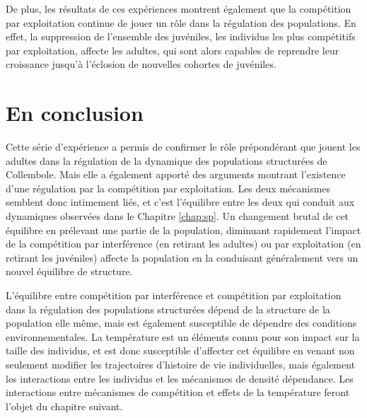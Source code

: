 De plus, les résultats de ces expériences montrent également que la compétition
par exploitation continue de jouer un rôle dans la régulation des populations.
En effet, la suppression de l'ensemble des juvéniles, les individus les plus
compétitifs par exploitation, affecte les adultes, qui sont alors capables de
reprendre leur croissance jusqu'à l'éclosion de nouvelles cohortes de juvéniles.

\section{En conclusion}

Cette série d'expérience a permis de confirmer le rôle
prépondérant que jouent les adultes dans la régulation de la dynamique des
populations structurées de Collembole. Mais elle a également apporté des
arguments montrant l'existence d'une régulation par la compétition par
exploitation. Les deux mécanismes semblent donc intimement liés, et c'est
l'équilibre entre les deux qui conduit aux dynamiques observées dans le Chapitre
\ref{chap:sp}. Un changement brutal de cet équilibre en prélevant une partie de
la population, diminuant rapidement l'impact de la compétition par interférence
(en retirant les adultes) ou par exploitation (en retirant les juvéniles)
affecte la population en la conduisant généralement vers un nouvel équilibre de
structure. 

L'équilibre entre compétition par interférence et compétition par exploitation
dans la régulation des populations structurées dépend de la structure de la
population elle même, mais est également susceptible de dépendre des conditions
environnementales. La température est un éléments connu pour son impact sur la
taille des individus, et est donc susceptible d'affecter cet équilibre en venant
non seulement modifier les trajectoires d'histoire de vie individuelles, mais
également les interactions entre les individus et les mécanismes de densité
dépendance. Les interactions entre mécanismes de compétition et effets
de la température feront l'objet du chapitre suivant. 

